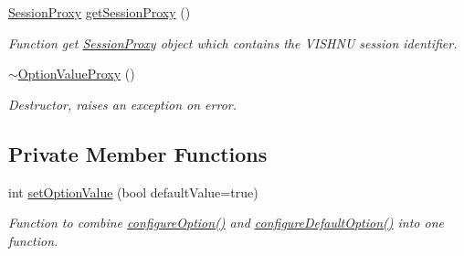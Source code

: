 \begin{DoxyCompactItemize}
\hyperlink{classSessionProxy}{SessionProxy} \hyperlink{classOptionValueProxy_a8abc209f73eb2e3be4cc6e90582815af}{getSessionProxy} ()
\begin{DoxyCompactList}\small\item\em Function get \hyperlink{classSessionProxy}{SessionProxy} object which contains the VISHNU session identifier. \item\end{DoxyCompactList}\item 
\hypertarget{classOptionValueProxy_ac248d37b83424317696d2899a365c34c}{
\hyperlink{classOptionValueProxy_ac248d37b83424317696d2899a365c34c}{$\sim$OptionValueProxy} ()}
\label{classOptionValueProxy_ac248d37b83424317696d2899a365c34c}

\begin{DoxyCompactList}\small\item\em Destructor, raises an exception on error. \item\end{DoxyCompactList}\end{DoxyCompactItemize}
\subsection*{Private Member Functions}
\begin{DoxyCompactItemize}
\item 
int \hyperlink{classOptionValueProxy_a19f1ee32b83160377a3f35e95483c3ee}{setOptionValue} (bool defaultValue=true)
\begin{DoxyCompactList}\small\item\em Function to combine \hyperlink{classOptionValueProxy_ae6db8f1eb397361e86a37c45afca234f}{configureOption()} and \hyperlink{classOptionValueProxy_a2d4ef21b234a046918844158a5c9197f}{configureDefaultOption()} into one function. \item\end{DoxyCompactList}\end{DoxyCompactItemize}
